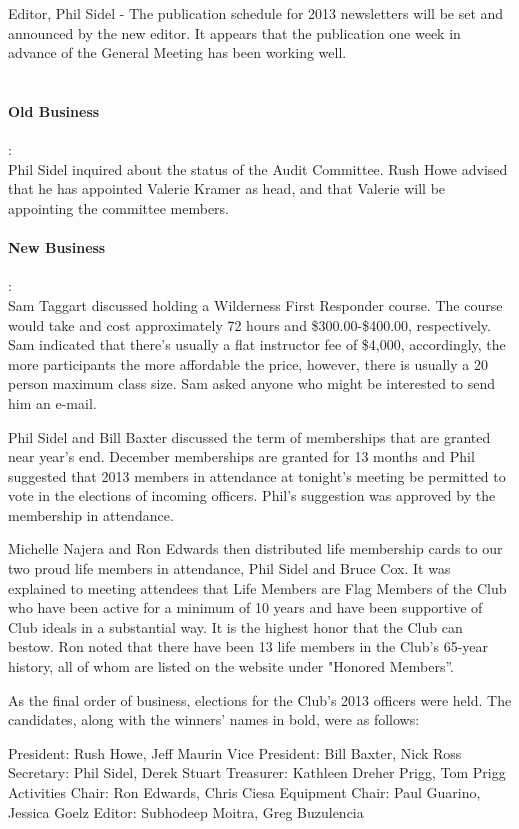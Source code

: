 \documentclass[10pt,a4paper]{article}
\begin{document}
\begin{multicols}{2}
Editor, Phil Sidel - The publication schedule for 2013 newsletters will be set and announced by the new editor.  It appears that the publication one week in advance of the General Meeting has been working well.
\\
\\
\paragraph{Old Business} :
\\
Phil Sidel inquired about the status of the Audit Committee.  Rush Howe advised that he has appointed Valerie Kramer as head, and that Valerie will be appointing the committee members.
\\
\paragraph{New Business} :
\\
Sam Taggart discussed holding a Wilderness First Responder course. The course would take and cost approximately 72 hours and \$300.00-\$400.00, respectively. Sam indicated that there's usually a flat instructor fee of \$4,000, accordingly, the more participants the more affordable the price, however, there is usually a 20 person maximum class size.  Sam asked anyone who might be interested to send him an e-mail.

Phil Sidel and Bill Baxter discussed the term of memberships that are granted near year's end. December memberships are granted for 13 months and Phil suggested that 2013 members in attendance at tonight's meeting be permitted to vote in the elections of incoming officers.  Phil's suggestion was approved by the membership in attendance.

Michelle Najera and Ron Edwards then distributed life membership cards to our two proud life members in attendance, Phil Sidel and Bruce Cox.  It was explained to meeting attendees that Life Members are Flag Members of the Club who have been active for a minimum of 10 years and have been supportive of Club ideals in a substantial way.  It is the highest honor that the Club can bestow.  Ron noted that there have been 13 life members in the Club's 65-year history, all of whom are listed on the website under "Honored Members”.

As the final order of business, elections for the Club's 2013 officers were held.  The candidates, along with the winners' names in bold, were as follows:

President:	Rush Howe, Jeff Maurin
Vice President:	Bill Baxter, Nick Ross
Secretary:	Phil Sidel, Derek Stuart
Treasurer:	Kathleen Dreher Prigg, Tom Prigg
Activities Chair:	Ron Edwards, Chris Ciesa
Equipment Chair:	Paul Guarino, Jessica Goelz
Editor:		Subhodeep Moitra, Greg Buzulencia


\end{multicols}
\end{document}
